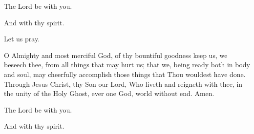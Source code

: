 

\rubric{\Vbar}The Lord be with you.

\rubric{\Rbar}And with thy spirit.

Let us pray.

O Almighty and most merciful God, of thy bountiful goodness keep us, we beseech thee, from all things that may hurt us; that we, being ready both in body and soul, may cheerfully accomplish those things that Thou wouldest have done.  Through Jesus Christ, thy Son our Lord, Who liveth and reigneth with thee, in the unity of the Holy Ghost, ever one God, world without end.\rubric{\Rbar} Amen.

\rubric{\Vbar}The Lord be with you.

\rubric{\Rbar}And with thy spirit.
